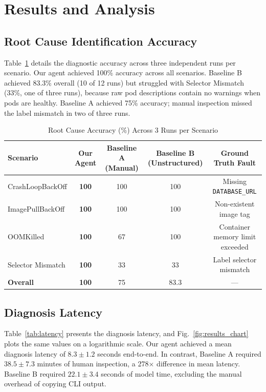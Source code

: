 \documentclass[12pt,onecolumn,draftclsnofoot]{IEEEtran}
\begin{document}
\section{Results and Analysis}

\subsection{Root Cause Identification Accuracy}
Table~\ref{tab:accuracy} details the diagnostic accuracy across three independent runs per scenario. Our agent achieved 100\% accuracy across all scenarios. Baseline B achieved 83.3\% overall (10 of 12 runs) but struggled with Selector Mismatch (33\%, one of three runs), because raw pod descriptions contain no warnings when pods are healthy. Baseline A achieved 75\% accuracy; manual inspection missed the label mismatch in two of three runs.

\begin{table}[h]
\caption{Root Cause Accuracy (\%) Across 3 Runs per Scenario}
\label{tab:accuracy}
\centering
\begin{tabular}{lcccc}
\toprule
\textbf{Scenario} & \textbf{Our Agent} & \textbf{Baseline A (Manual)} & \textbf{Baseline B (Unstructured)} & \textbf{Ground Truth Fault} \\
\midrule
CrashLoopBackOff    & \textbf{100} & 100 & 100 & Missing \texttt{DATABASE\_URL} \\
ImagePullBackOff    & \textbf{100} & 100 & 100 & Non-existent image tag \\
OOMKilled           & \textbf{100} & 67  & 100 & Container memory limit exceeded \\
Selector Mismatch   & \textbf{100} & 33  & 33  & Label selector mismatch \\
\midrule
\textbf{Overall}    & \textbf{100} & 75  & 83.3 & --- \\
\bottomrule
\end{tabular}
\end{table}

\subsection{Diagnosis Latency}
Table~\ref{tab:latency} presents the diagnosis latency, and Fig.~\ref{fig:results_chart} plots the same values on a logarithmic scale. Our agent achieved a mean diagnosis latency of $8.3 \pm 1.2$ seconds end-to-end. In contrast, Baseline A required $38.5 \pm 7.3$ minutes of human inspection, a 278$\times$ difference in mean latency. Baseline B required $22.1 \pm 3.4$ seconds of model time, excluding the manual overhead of copying CLI output.
\end{document}
